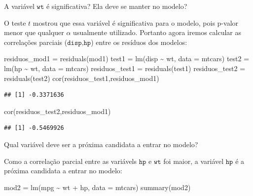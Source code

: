 \documentclass[
]{book}
\newenvironment{Shaded}{\begin{snugshade}}{\end{snugshade}}
\newcommand{\AttributeTok}[1]{\textcolor[rgb]{0.77,0.63,0.00}{#1}}
\newcommand{\FunctionTok}[1]{\textcolor[rgb]{0.00,0.00,0.00}{#1}}
\newcommand{\NormalTok}[1]{#1}
\newcommand{\OtherTok}[1]{\textcolor[rgb]{0.56,0.35,0.01}{#1}}
\newcommand{\SpecialCharTok}[1]{\textcolor[rgb]{0.00,0.00,0.00}{#1}}
\begin{document}
A variável \(\texttt{wt}\) é significativa? Ela deve se manter no modelo?

O teste \(t\) mostrou que essa variável é significativa para o modelo, pois p-valor menor que qualquer \(\alpha\) usualmente utilizado. Portanto agora iremos calcular as correlações parciais (\(\texttt{disp,hp}\)) entre os resíduos dos modelos:

\begin{Shaded}
\begin{Highlighting}[]
\NormalTok{residuos\_mod1 }\OtherTok{=} \FunctionTok{residuals}\NormalTok{(mod1)}
\NormalTok{test1 }\OtherTok{=} \FunctionTok{lm}\NormalTok{(disp }\SpecialCharTok{\textasciitilde{}}\NormalTok{ wt, }\AttributeTok{data =}\NormalTok{ mtcars)}
\NormalTok{test2 }\OtherTok{=} \FunctionTok{lm}\NormalTok{(hp }\SpecialCharTok{\textasciitilde{}}\NormalTok{ wt, }\AttributeTok{data =}\NormalTok{ mtcars)}
\NormalTok{residuos\_test1 }\OtherTok{=} \FunctionTok{residuals}\NormalTok{(test1)}
\NormalTok{residuos\_test2 }\OtherTok{=} \FunctionTok{residuals}\NormalTok{(test2)}
\FunctionTok{cor}\NormalTok{(residuos\_test1,residuos\_mod1)}
\end{Highlighting}
\end{Shaded}

\begin{verbatim}
## [1] -0.3371636
\end{verbatim}

\begin{Shaded}
\begin{Highlighting}[]
\FunctionTok{cor}\NormalTok{(residuos\_test2,residuos\_mod1)}
\end{Highlighting}
\end{Shaded}

\begin{verbatim}
## [1] -0.5469926
\end{verbatim}

Qual variável deve ser a próxima candidata a entrar no modelo?

Como a correlação parcial entre as variávels \(\texttt{hp}\) e \(\texttt{wt}\) foi maior, a variável \(\texttt{hp}\) é a próxima candidata a entrar no modelo:

\begin{Shaded}
\begin{Highlighting}[]
\NormalTok{mod2 }\OtherTok{=} \FunctionTok{lm}\NormalTok{(mpg }\SpecialCharTok{\textasciitilde{}}\NormalTok{ wt }\SpecialCharTok{+}\NormalTok{ hp, }\AttributeTok{data =}\NormalTok{ mtcars)}
\FunctionTok{summary}\NormalTok{(mod2)}
\end{Highlighting}
\end{Shaded}
\end{document}
